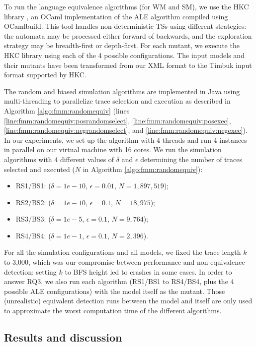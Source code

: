 To run the language equivalence algorithms (for WM and SM), we use the HKC library \cite{hkc}, an OCaml implementation of the ALE  algorithm \cite{Bonchi2013} compiled using OCamlbuild. This tool handles non-deterministic TSs using different strategies: the automata may be processed either forward of backwards, and the exploration strategy may be breadth-first or depth-first. For each mutant, we execute the HKC library using each of the 4 possible configurations. The input models and their mutants have been transformed from our XML format to the Timbuk input format supported by HKC.

The random and biased simulation algorithms are implemented in Java using multi-threading to parallelize trace selection and execution as described in Algorithm \ref{algo:fmm:randomequiv} (lines \ref{line:fmm:randomequiv:posrandomselect}, \ref{line:fmm:randomequiv:posexec}, \ref{line:fmm:randomequiv:negrandomselect}, and \ref{line:fmm:randomequiv:negexec}). In our experiments, we set up the algorithm with 4 threads and run 4 instances in parallel on our virtual machine with 16 cores.
We run the simulation algorithms with 4 different values of $\delta$ and $\epsilon$ determining the number of traces selected and executed ($N$ in Algorithm \ref{algo:fmm:randomequiv}): 
\begin{itemize}
\item RS1/BS1: ($\delta=1e-10$, $\epsilon=0.01$, $N=1,897,519$);
\item RS2/BS2: ($\delta=1e-10$, $\epsilon=0.1$, $N=18,975$);
\item RS3/BS3: ($\delta=1e-5$, $\epsilon=0.1$, $N=9,764$);
\item RS4/BS4: ($\delta=1e-1$, $\epsilon=0.1$, $N=2,396$).
\end{itemize}

For all the simulation configurations and all models, we fixed the trace length $k$ to 3,000, which was our compromise between performance and non-equivalence detection: setting $k$ to BFS height led to crashes in some cases. In order to answer RQ3, we also run each algorithm (RS1/BS1 to RS4/BS4, plus the 4 possible ALE configurations) with the model itself as the mutant. Those (unrealistic) equivalent detection runs between the model and itself are only used to approximate the worst computation time of the different algorithms.

\subsection{Results and discussion}

